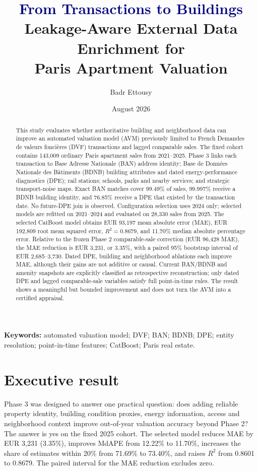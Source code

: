 \documentclass[11pt,a4paper]{article}
\title{\textcolor{navy}{\textbf{From Transactions to Buildings}}\\[0.25em]
\large Leakage-Aware External Data Enrichment for\\
Paris Apartment Valuation}
\author{Badr Ettousy}
\date{August 2026}
\begin{document}
\maketitle

\begin{abstract}
This study evaluates whether authoritative building and neighborhood data can
improve an automated valuation model (AVM) previously limited to French
Demandes de valeurs fonci\`eres (DVF) transactions and lagged comparable sales.
The fixed cohort contains 143,009 ordinary Paris apartment sales from
2021--2025. Phase 3 links each transaction to Base Adresse Nationale (BAN)
address identity; Base de Donn\'ees Nationale des B\^atiments (BDNB) building
attributes and dated energy-performance diagnostics (DPE); rail stations;
schools, parks and nearby services; and strategic transport-noise maps. Exact
BAN matches cover 99.49\% of sales, 99.997\% receive a BDNB building identity,
and 76.85\% receive a DPE that existed by the transaction date. No future-DPE
join is observed. Configuration selection uses 2024 only; selected models are
refitted on 2021--2024 and evaluated on 28,330 sales from 2025. The selected
CatBoost model obtains EUR 93,197 mean absolute error (MAE), EUR 192,809 root
mean squared error, $R^2=0.8679$, and 11.70\% median absolute percentage error.
Relative to the frozen Phase 2 comparable-sale correction (EUR 96,428 MAE), the
MAE reduction is EUR 3,231, or 3.35\%, with a paired 95\% bootstrap interval of
EUR 2,685--3,730. Dated DPE, building and neighborhood ablations each improve
MAE, although their gains are not additive or causal. Current BAN/BDNB and
amenity snapshots are explicitly classified as retrospective reconstruction;
only dated DPE and lagged comparable-sale variables satisfy full point-in-time
rules. The result shows a meaningful but bounded improvement and does not turn
the AVM into a certified appraisal.
\end{abstract}

\textbf{Keywords:} automated valuation model; DVF; BAN; BDNB; DPE; entity
resolution; point-in-time features; CatBoost; Paris real estate.

\section{Executive result}

Phase 3 was designed to answer one practical question: does adding reliable
property identity, building condition proxies, energy information, access and
neighborhood context improve out-of-year valuation accuracy beyond Phase 2?
The answer is yes on the fixed 2025 cohort. The selected model reduces MAE by
EUR 3,231 (3.35\%), improves MdAPE from 12.22\% to 11.70\%, increases the share
of estimates within 20\% from 71.69\% to 73.40\%, and raises $R^2$ from 0.8601
to 0.8679. The paired interval for the MAE reduction excludes zero.
\end{document}
